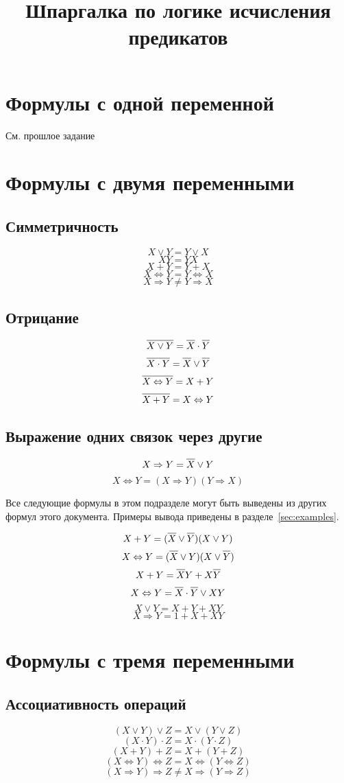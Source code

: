 \documentclass{article}
\title{Шпаргалка по логике исчисления предикатов}
\author{}
\date{}
\numberwithin{equation}{subsection}
\renewcommand{\[}{\begin{equation}}
\renewcommand{\]}{\end{equation}}
\newcommand{\NE}[1]{\overline{\vphantom{|} #1}}
\begin{document}
\section{Формулы с одной переменной}

См. прошлое задание

\section{Формулы с двумя переменными}

\subsection{Симметричность}
\[X \vee Y = Y \vee X\]
\[XY = YX\]
\[X + Y = Y + X\]
\[X \Leftrightarrow Y = Y \Leftrightarrow X\]
\[X \Rightarrow Y \ne Y \Rightarrow X\]

\subsection{Отрицание}
\[\NE{X\vee Y} = \NE{X}\cdot\NE{Y}\]
\[\NE{X\cdot Y} = \NE{X}\vee\NE{Y}\]
\[\NE{X\Leftrightarrow Y} = X+Y\]
\[\NE{X + Y} = X\Leftrightarrow Y\]

\subsection{Выражение одних связок через другие}

\[X\Rightarrow Y = \NE{X} \vee Y \]
\[X\Leftrightarrow Y = (X\Rightarrow Y)(Y\Rightarrow X)\]

Все следующие формулы в этом подразделе могут быть выведены из других формул этого документа. Примеры вывода приведены в разделе~\ref{sec:examples}.

\[X + Y = (\NE{X} \vee \NE{Y})(X \vee Y)\]
\[X \Leftrightarrow Y = (\NE{X} \vee Y)(X \vee \NE{Y})\]
\[X + Y = \NE{X}Y + X\NE{Y}\]
\[X \Leftrightarrow Y = \NE{X}\cdot\NE{Y} \vee XY\]
\[X \vee Y = X + Y + XY\]
\[X \Rightarrow Y = 1 + X + XY\]

\section{Формулы с тремя переменными}
\subsection{Ассоциативность операций}
\[(X \vee Y) \vee Z = X \vee (Y \vee Z)\]
\[(X \cdot Y) \cdot Z = X \cdot (Y \cdot Z)\]
\[(X + Y) + Z = X + (Y + Z)\]
\[(X \Leftrightarrow Y) \Leftrightarrow Z = X \Leftrightarrow (Y \Leftrightarrow Z)\]
\[(X \Rightarrow Y) \Rightarrow Z \ne X \Rightarrow (Y \Rightarrow Z)\]
\end{document}
